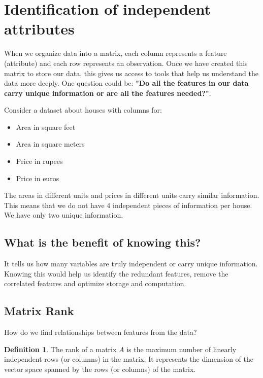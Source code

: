 \documentclass[11pt,a4paper]{article}
\theoremstyle{definition}
\newtheorem{definition}{Definition}[section]
\begin{document}
\section{Identification of independent attributes}

When we organize data into a matrix, each column represents a feature (attribute) and each row represents an observation. 
Once we have created this matrix to store our data, this gives us access to tools that help us understand the data more deeply. 
One question could be: \textbf{"Do all the features in our data carry unique information or are all the features needed?"}.

\begin{examplebox}[Example]

Consider a dataset about houses with columns for:
\begin{itemize}
    \item Area in square feet
    \item Area in square meters
    \item Price in rupees
    \item Price in euros
\end{itemize}

The areas in different units and prices in different units carry similar information. 
This means that we do not have 4 independent pieces of information per house. 
We have only two unique information.

\end{examplebox}

\subsection{What is the benefit of knowing this?}
\noindent It tells us how many variables are truly independent or carry unique information. Knowing this would help us
identify the redundant features, remove the correlated features and optimize storage and computation.


\subsection{Matrix Rank}

How do we find relationships between features from the data? 

\begin{defbox}
\begin{definition}
The rank of a matrix $A$ is the maximum number of linearly independent rows (or columns) in the matrix. 
It represents the dimension of the vector space spanned by the rows (or columns) of the matrix. 
\end{definition}
\end{defbox}
\end{document}
